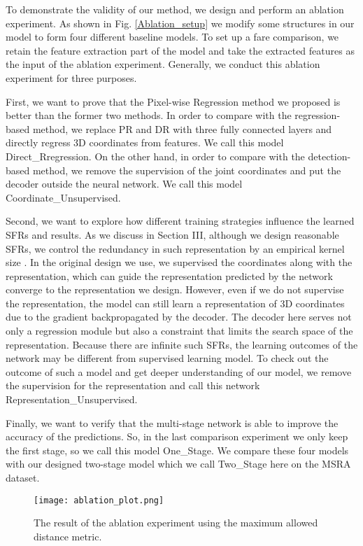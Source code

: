 \documentclass[journal]{IEEEtran}
\begin{document}
To demonstrate the validity of our method, we design and perform an ablation experiment. 
As shown in Fig\@. \ref{Ablation_setup} we modify some structures in our model to form four different baseline models. 
To set up a fare comparison, we retain the feature extraction part of the model and take the extracted features as the input of the ablation experiment. 
Generally, we conduct this ablation experiment for three purposes. 

First, we want to prove that the Pixel-wise Regression method we proposed is better than the former two methods. 
In order to compare with the regression-based method, 
we replace PR and DR with three fully connected layers and directly regress 3D coordinates from features. 
We call this model Direct\_Rregression. 
On the other hand, in order to compare with the detection-based method, 
we remove the supervision of the joint coordinates and put the decoder outside the neural network. 
We call this model Coordinate\_Unsupervised. 

Second, we want to explore how different training strategies influence the learned SFRs and results. 
As we discuss in Section III, although we design reasonable SFRs, 
we control the redundancy in such representation by an empirical kernel size . 
In the original design we use, we supervised the coordinates along with the representation, 
which can guide the representation predicted by the network converge to the representation we design. 
However, even if we do not supervise the representation, 
the model can still learn a representation of 3D coordinates due to the gradient backpropagated by the decoder. 
The decoder here serves not only a regression module but also a constraint that limits the search space of the representation. 
Because there are infinite such SFRs, the learning outcomes of the network may be different from supervised learning model. 
To check out the outcome of such a model and get deeper understanding of our model, 
we remove the supervision for the representation and call this network Representation\_Unsupervised. 

Finally, we want to verify that the multi-stage network is able to improve the accuracy of the predictions. 
So, in the last comparison experiment we only keep the first stage, so we call this model One\_Stage. 
We compare these four models with our designed two-stage model which we call Two\_Stage here on the MSRA dataset.

\begin{figure}[!t]
  \centering
  \texttt{[image: ablation\_plot.png]}
  \caption{The result of the ablation experiment using the maximum allowed distance metric.}
  \label{Ablation_Plot}
\end{figure}
\end{document}
